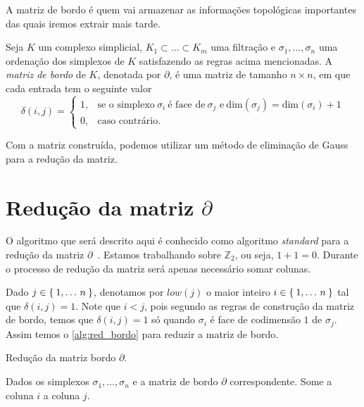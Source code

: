 A matriz de bordo é quem vai armazenar as informações topológicas importantes
das quais iremos extrair mais tarde.
\begin{defi}
  Seja $K$ um complexo simplicial, $K_{1} \subset \dots \subset K_{m}$ uma filtração
  e $\sigma_1, \dots, \sigma_n$ uma ordenação dos simplexos de $K$ satisfazendo as
  regras acima mencionadas. A \textit{matriz de bordo} de $K$, denotada por $\partial$,
  é uma matriz de tamanho $n \times n$, em que cada entrada tem o seguinte valor
  \begin{equation*}
    \delta(i,j) =
      \begin{cases}
        1, & \text{se o simplexo} \ \sigma_i \ \text{é face de} \ \sigma_j
        \text{ e} \ \text{dim}(\sigma_j) = \text{dim}(\sigma_i) + 1 \\
        0, & \text{caso contrário.}
    \end{cases}
  \end{equation*}
\end{defi}
Com a matriz construída, podemos utilizar um método de eliminação de Gauss
para a redução da matriz.

\section{Redução da matriz $\partial$}
O algoritmo que será descrito aqui é conhecido como algoritmo \textit{standard}
para a redução da matriz $\partial$~\cite{Edelsbrunner2000}. Estamos trabalhando
sobre $\mathbb{Z}_2$, ou seja, $1+1 = 0$. Durante o processo de redução da matriz
será apenas necessário somar colunas.

Dado $j \in \Set{1,\dots\,n}$, denotamos por $low(j)$ o maior inteiro
$i \in \Set{1,\dots\,n} $ tal que $\delta(i,j)=1$. Note que $i < j$, pois segundo
as regras de construção da matriz de bordo, temos que $\delta(i,j) = 1$ só
quando $\sigma_i$ é face de codimensão $1$ de $\sigma_j$. Assim temos o
\autoref{alg:red_bordo} para reduzir a matriz de bordo.

\begin{algorithm}[!htpb]
  \caption{Redução da matriz bordo $\partial$.}
  \label{alg:red_bordo}
  \begin{algorithmic}[1]
    \State Dados os simplexos $\sigma_1, \dots, \sigma_n$ e a matriz de bordo
    $\partial$ correspondente.
        \State Some a coluna $i$ a coluna $j$.
      \EndWhile
    \EndFor
  \end{algorithmic}
\end{algorithm}

